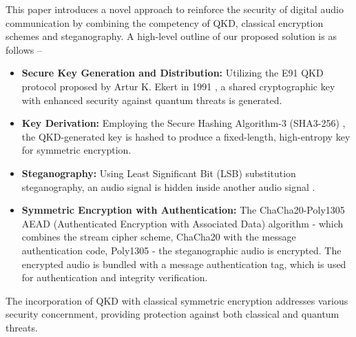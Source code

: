 \documentclass[a4paper]{cas-sc}
\begin{document}
This paper introduces a novel approach to reinforce the security of digital audio communication by combining the competency of QKD, classical encryption schemes and steganography. A high-level outline of our proposed solution is as follows --
\begin{itemize}
    \item \textbf{Secure Key Generation and Distribution:} Utilizing the E91 QKD protocol proposed by Artur K. Ekert in 1991 \cite{Ekert1991}, a shared cryptographic key with enhanced security against quantum threats is generated.
    \item \textbf{Key Derivation:} Employing the Secure Hashing Algorithm-3 (SHA3-256) \cite{dworkin2015sha}, the QKD-generated key is hashed to produce a fixed-length, high-entropy key for symmetric encryption.
    \item \textbf{Steganography:} Using Least Significant Bit (LSB) substitution steganography, an audio signal is hidden inside another audio signal \cite{cvejic2002increasing}.
    \item \textbf{Symmetric Encryption with Authentication:} The ChaCha20-Poly1305 AEAD (Authenticated Encryption with Associated Data) algorithm \cite{rfc7539} - which combines the stream cipher scheme, ChaCha20 \cite{bernstein2008chacha} with the message authentication code, Poly1305 \cite{bernstein2005poly1305} - the steganographic audio is encrypted. The encrypted audio is bundled with a message authentication tag, which is used for authentication and integrity verification.
\end{itemize}
The incorporation of QKD with classical symmetric encryption addresses various security concernment, providing protection against both classical and quantum threats.
\end{document}

